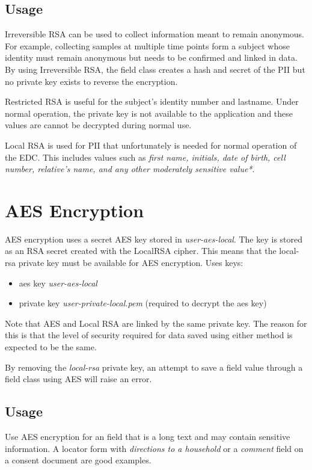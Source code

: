 \documentclass[letterpaper,10pt,english]{sphinxmanual}
\begin{document}
\subsection{Usage}
\label{selecting_field_classes:usage}
Irreversible RSA can be used to collect information meant to remain anonymous. For example, collecting samples at
multiple time points form a subject whose identity must remain anonymous but needs to be confirmed and linked in data.
By using Irreversible RSA, the field class creates a hash and secret of the PII but no private key exists
to reverse the encryption.

Restricted RSA is useful for the subject's identity number and lastname. Under normal operation, the private key is
not available to the application and these values are cannot be decrypted during normal use.

Local RSA is used for PII that unfortunately is needed for normal operation of the EDC. This includes values such as
\emph{first name, initials, date of birth, cell number, relative's name, and any other moderately sensitive value*}.


\section{AES Encryption}
\label{selecting_field_classes:aes-encryption}
AES encryption uses a secret AES key stored in \emph{user-aes-local}. The key is stored as an RSA secret created with the LocalRSA cipher.
This means that the local-rsa private key must be available for AES encryption. Uses keys:
\begin{itemize}
\item {} 
aes key \emph{user-aes-local}

\item {} 
private key \emph{user-private-local.pem} (required to decrypt the aes key)

\end{itemize}

Note that AES and Local RSA are linked by the same private key. The reason for this is that the level of security required
for data saved using either method is expected to be the same.

By removing the \emph{local-rsa} private key, an attempt to save a field value through a field class using AES will raise an error.


\subsection{Usage}
\label{selecting_field_classes:id1}
Use AES encryption for an field that is a long text and may contain sensitive information. A locator form with
\emph{directions to a household} or a \emph{comment} field on a consent document are good examples.
\end{document}
